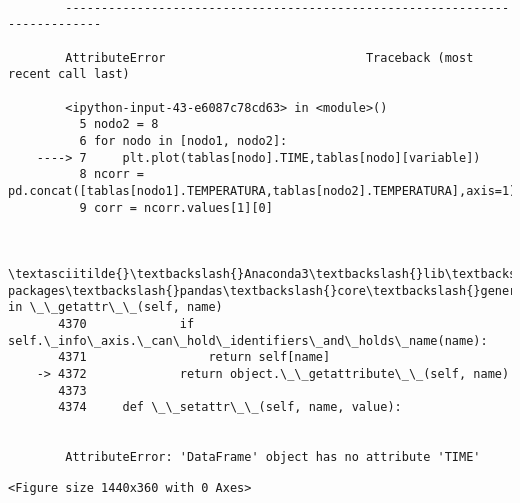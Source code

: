 \documentclass[11pt]{article}
\begin{document}
    \begin{Verbatim}[commandchars=\\\{\}]

        ---------------------------------------------------------------------------

        AttributeError                            Traceback (most recent call last)

        <ipython-input-43-e6087c78cd63> in <module>()
          5 nodo2 = 8
          6 for nodo in [nodo1, nodo2]:
    ----> 7     plt.plot(tablas[nodo].TIME,tablas[nodo][variable])
          8 ncorr = pd.concat([tablas[nodo1].TEMPERATURA,tablas[nodo2].TEMPERATURA],axis=1).corr()
          9 corr = ncorr.values[1][0]
    

        \textasciitilde{}\textbackslash{}Anaconda3\textbackslash{}lib\textbackslash{}site-packages\textbackslash{}pandas\textbackslash{}core\textbackslash{}generic.py in \_\_getattr\_\_(self, name)
       4370             if self.\_info\_axis.\_can\_hold\_identifiers\_and\_holds\_name(name):
       4371                 return self[name]
    -> 4372             return object.\_\_getattribute\_\_(self, name)
       4373 
       4374     def \_\_setattr\_\_(self, name, value):
    

        AttributeError: 'DataFrame' object has no attribute 'TIME'

    \end{Verbatim}

    
    \begin{verbatim}
<Figure size 1440x360 with 0 Axes>
    \end{verbatim}

    

    
    
    
    
\end{document}
